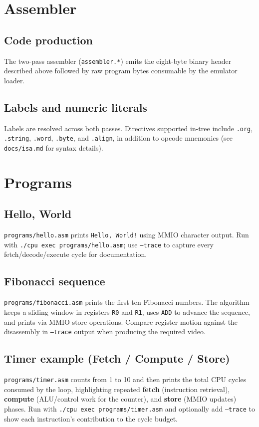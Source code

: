 \documentclass[12pt]{article}
\begin{document}
\section{Assembler}
\subsection{Code production}
The two-pass assembler (\texttt{assembler.*}) emits the eight-byte binary header described above followed by raw program bytes consumable by the emulator loader.

\subsection{Labels and numeric literals}
Labels are resolved across both passes. Directives supported in-tree include \texttt{.org}, \texttt{.string}, \texttt{.word}, \texttt{.byte}, and \texttt{.align}, in addition to opcode mnemonics (see \texttt{docs/isa.md} for syntax details).

\section{Programs}
\subsection{Hello, World}
\texttt{programs/hello.asm} prints \texttt{Hello, World!} using MMIO character output. Run with \texttt{./cpu exec programs/hello.asm}; use \texttt{--trace} to capture every fetch/decode/execute cycle for documentation.

\subsection{Fibonacci sequence}
\texttt{programs/fibonacci.asm} prints the first ten Fibonacci numbers. The algorithm keeps a sliding window in registers \texttt{R0} and \texttt{R1}, uses \texttt{ADD} to advance the sequence, and prints via MMIO store operations. Compare register motion against the disassembly in \texttt{--trace} output when producing the required video.

\subsection{Timer example (Fetch / Compute / Store)}
\texttt{programs/timer.asm} counts from 1 to 10 and then prints the total CPU cycles consumed by the loop, highlighting repeated \textbf{fetch} (instruction retrieval), \textbf{compute} (ALU/control work for the counter), and \textbf{store} (MMIO updates) phases. Run with \texttt{./cpu exec programs/timer.asm} and optionally add \texttt{--trace} to show each instruction's contribution to the cycle budget.
\end{document}
